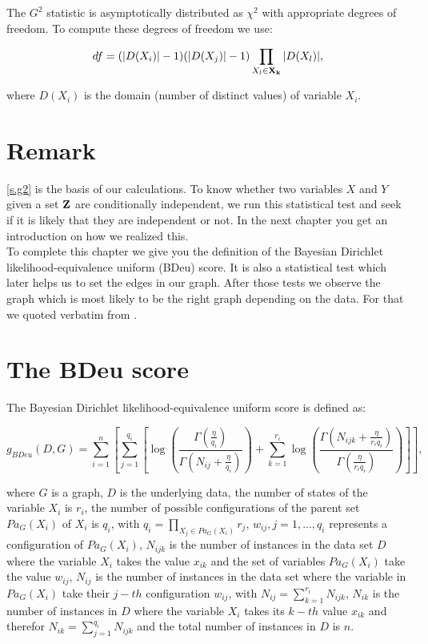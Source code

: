 		The $G^{2}$ statistic is asymptotically distributed as $\chi^{2}$ with appropriate degrees of freedom. To compute these degrees of freedom we use:

		\begin{equation}
			df = (|D(X_{i})| - 1)(|D(X_{j})| - 1) \prod_{X_{l} \in {\textbf{X}}_{{\textbf{k}}}} |D(X_{l})|,
		\end{equation}

		where $D(X_{i})$ is the domain (number of distinct values) of variable $X_{i}$.%

	\section*{Remark}

		\autoref{s.g2} is the basis of our calculations. To know whether two variables $X$ and $Y$ given a set ${\textbf{Z}}$ are conditionally independent, we run this statistical test and seek if it is likely that they are independent or not. In the next chapter you get an introduction on how we realized this. \\
		To complete this chapter we give you the definition of the Bayesian Dirichlet likelihood-equivalence uniform (BDeu) score. It is also a statistical test which later helps us to set the edges in our graph. After those tests we observe the graph which is most likely to be the right graph depending on the data. For that we quoted verbatim from \cite{Ca06}.

	\section*{The BDeu score} \label{s.BDeu}

		The Bayesian Dirichlet likelihood-equivalence uniform score is defined as:

		\begin{equation}
			g_{BDeu}(D, G) = \sum_{i = 1}^{n} \left[ \sum_{j = 1}^{q_{i}} \left[ \log\left( \frac{\Gamma (\frac{\eta}{q_{i}})}{\Gamma (N_{ij} + \frac{\eta}{q_{i}})} \right) + \sum_{k = 1}^{r_{i}} \log \left( \frac{\Gamma (N_{ijk} + \frac{\eta}{r_{i} q_{i}})}{\Gamma (\frac{\eta}{r_{i} q_{i}})} \right) \right] \right],
		\end{equation}

		where $G$ is a graph, $D$ is the underlying data, the number of states of the variable $X_{i}$ is $r_{i}$, the number of possible configurations of the parent set $Pa_{G}(X_{i})$ of $X_{i}$ is $q_{i}$, with $q_{i} = \prod_{X_{j} \in Pa_{G}(X_{i})} r_{j}$, $w_{ij}, j = 1,...,q_{i}$ represents a configuration of $Pa_{G}(X_{i})$, $N_{ijk}$ is the number of instances in the data set $D$ where the variable $X_{i}$ takes the value $x_{ik}$ and the set of variables $Pa_{G}(X_{i})$ take the value $w_{ij}$, $N_{ij}$ is the number of instances in the data set where the variable in $Pa_{G}(X_{i})$ take their $j-th$ configuration $w_{ij}$, with $N_{ij} = \sum_{k = 1}^{r_{i}} N_{ijk}$, $N_{ik}$ is the number of instances in $D$ where the variable $X_{i}$ takes its $k-th$ value $x_{ik}$ and therefor $N_{ik} = \sum_{j = 1}^{q_{i}} N_{ijk}$ and the total number of instances in $D$ is $n$.

